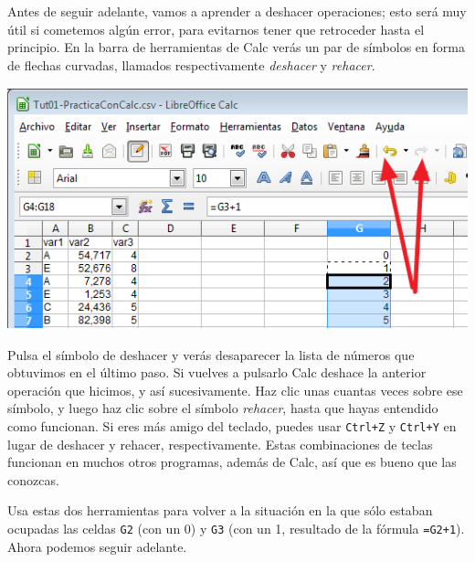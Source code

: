 \documentclass[10pt,a4paper]{article}\usepackage[]{graphicx}\usepackage[]{color}
\begin{document}
Antes de seguir adelante, vamos a aprender a deshacer operaciones; esto será muy útil si cometemos algún error, para evitarnos tener que retroceder hasta el principio. En la barra de herramientas de Calc verás un par de símbolos en forma de flechas curvadas, llamados respectivamente {\em deshacer} y {\em rehacer}.
    \begin{center}
    \includegraphics[height=7cm]{../fig/Tut01-Calc-Formula-06.png}
    \end{center}
Pulsa el símbolo de deshacer y verás desaparecer la lista de números que obtuvimos en el último paso. Si vuelves a pulsarlo Calc deshace la anterior operación que hicimos, y así sucesivamente. Haz clic unas cuantas veces sobre ese símbolo, y luego haz clic sobre el símbolo {\em rehacer}, hasta que hayas entendido como funcionan. Si eres más amigo del teclado, puedes usar {\tt Ctrl+Z} y {\tt Ctrl+Y} en lugar de deshacer y rehacer, respectivamente. Estas combinaciones de teclas funcionan en muchos otros programas, además de Calc, así que es bueno que las conozcas.

Usa estas dos herramientas para volver a la situación en la que sólo estaban ocupadas las celdas {\tt G2} (con un 0) y {\tt G3} (con un 1, resultado de la fórmula {\tt =G2+1}). Ahora podemos seguir adelante.
\end{document}
